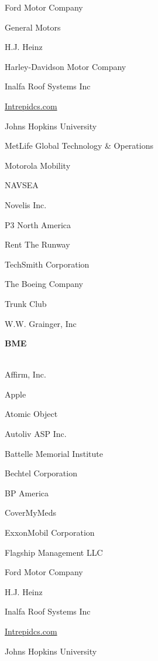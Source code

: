 \documentclass[twoside]{article}
\begin{document}
\begin{center}
\begin{multicols}{5}
\begin{FlushLeft}
\begin{compactitem}
\item Ford Motor Company
\item General Motors
\item H.J. Heinz
\item Harley-Davidson Motor Company
\item Inalfa Roof Systems Inc
\item \url{Intrepidcs.com}
\item Johns Hopkins University
\item MetLife Global Technology \& Operations
\item Motorola Mobility
\item NAVSEA
\item Novelis Inc.
\item P3 North America
\item Rent The Runway
\item TechSmith Corporation
\item The Boeing Company
\item Trunk Club
\item W.W. Grainger, Inc
\end{compactitem}
        \end{FlushLeft}
        \vspace{1em}
        {\fontsize{14}{16}\selectfont \bf BME}\\
        \vspace{-1em}
        ~\hrulefill~
        \vspace{-.9em}
        \begin{FlushLeft}
        \begin{compactitem}
        \item Affirm, Inc.
\item Apple
\item Atomic Object
\item Autoliv ASP Inc.
\item Battelle Memorial Institute
\item Bechtel Corporation
\item BP America
\item CoverMyMeds
\item ExxonMobil Corporation
\item Flagship Management LLC
\item Ford Motor Company
\item H.J. Heinz
\item Inalfa Roof Systems Inc
\item \url{Intrepidcs.com}
\item Johns Hopkins University

\end{compactitem}
\end{FlushLeft}
\end{multicols}
\end{center}
\end{document}
